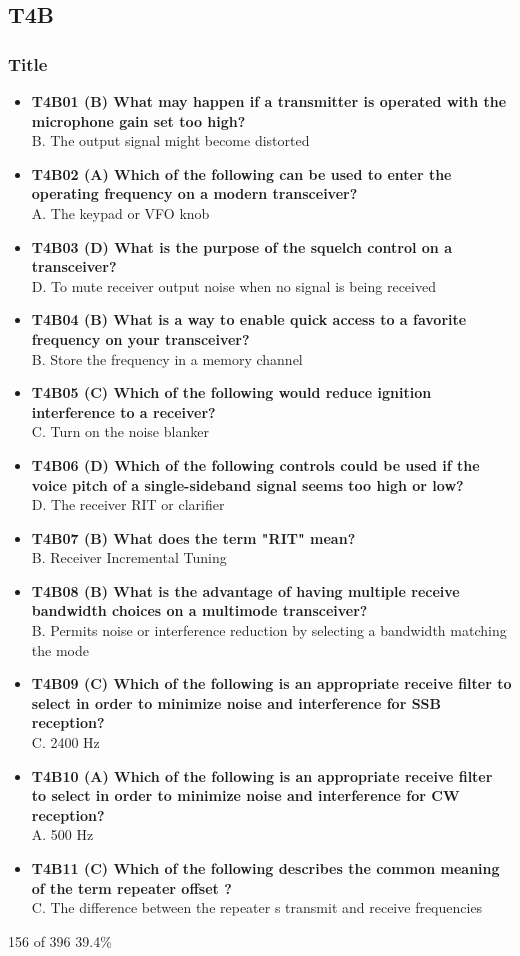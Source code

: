 \documentclass[10pt]{beamer}
\begin{document}
\subsection{T4B}
\begin{frame}
\frametitle{Title}
\begin{itemize}[<+->]
\tiny
\item\textbf{T4B01 (B) What may happen if a transmitter is operated with the microphone gain set too high?}\\ B. The output signal might become distorted
\item\textbf{T4B02 (A) Which of the following can be used to enter the operating frequency on a modern transceiver?}\\ A. The keypad or VFO knob
\item\textbf{T4B03 (D) What is the purpose of the squelch control on a transceiver?}\\ D. To mute receiver output noise when no signal is being received
\item\textbf{T4B04 (B) What is a way to enable quick access to a favorite frequency on your transceiver?}\\ B. Store the frequency in a memory channel
\item\textbf{T4B05 (C) Which of the following would reduce ignition interference to a receiver?}\\ C. Turn on the noise blanker
\item\textbf{T4B06 (D) Which of the following controls could be used if the voice pitch of a single-sideband signal seems too high or low?}\\ D. The receiver RIT or clarifier
\item\textbf{T4B07 (B) What does the term "RIT" mean?}\\ B. Receiver Incremental Tuning
\item\textbf{T4B08 (B) What is the advantage of having multiple receive bandwidth choices on a multimode transceiver?}\\ B. Permits noise or interference reduction by selecting a bandwidth matching the mode
\item\textbf{T4B09 (C) Which of the following is an appropriate receive filter to select in order to minimize noise and interference for SSB reception?}\\ C. 2400 Hz
\item\textbf{T4B10 (A) Which of the following is an appropriate receive filter to select in order to minimize noise and interference for CW reception?}\\ A. 500 Hz
\item\textbf{T4B11 (C) Which of the following describes the common meaning of the term  repeater offset ?}\\ C. The difference between the repeater s transmit and receive frequencies
\end{itemize}
\tiny 156 of 396  39.4\%
\end{frame}
\end{document}
